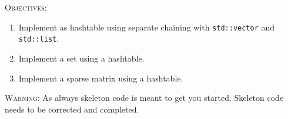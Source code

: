
\textsc{Objectives:}
\begin{enumerate}[topsep=0pt]
\item Implement as hashtable using separate chaining with
  \verb!std::vector! 
  and \verb!std::list!.
\item Implement a set using a hashtable.
\item Implement a sparse matrix using a hashtable.
\end{enumerate}

\textsc{Warning}:
As always skeleton code is meant to get you started.
Skeleton code needs to be corrected and completed.
